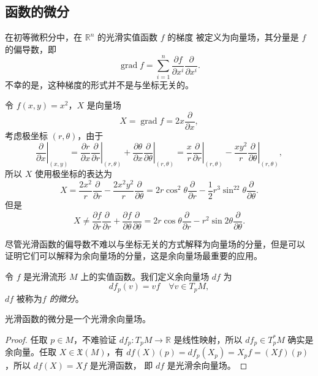 \documentclass[fontset=none]{Notes}
\DeclareMathOperator\grad{grad}
\begin{document}
\subsection{函数的微分}

在初等微积分中，在 $\mathbb{R}^n$ 的光滑实值函数 $f$ 的梯度
被定义为向量场，其分量是 $f$ 的偏导数，即
\begin{equation}
  \grad f= \sum_{i=1}^n\frac{\partial f}{\partial x^i}\frac{\partial}{\partial x^i}.
\end{equation}
不幸的是，这种梯度的形式并不是与坐标无关的。

\begin{example}
  令 $f(x,y)=x^2$，$X$ 是向量场
  \[
    X=\grad f=2x\frac{\partial}{\partial x},  
  \]
  考虑极坐标 $(r,\theta)$，由于
  \[
    \left.\frac{\partial}{\partial x}\right|_{(x,y)} 
    =\frac{\partial r}{\partial x}\left.\frac{\partial}{\partial r}\right|_{(r,\theta)} 
    +\frac{\partial \theta}{\partial x}\left.\frac{\partial}{\partial \theta}\right|_{(r,\theta)} 
    =\frac{x}{r}\left.\frac{\partial}{\partial r}\right|_{(r,\theta)} 
    -\frac{xy^2}{r}\left.\frac{\partial}{\partial \theta}\right|_{(r,\theta)},
  \]
  所以 $X$ 使用极坐标的表达为
  \[
    X=  \frac{2x^2}{r}\frac{\partial}{\partial r}
    -\frac{2x^2y^2}{r}\frac{\partial}{\partial \theta}
    =2r\cos^2\theta\frac{\partial}{\partial r}-
    \frac{1}{2}r^3\sin^22\theta\frac{\partial}{\partial \theta}.
  \]
  但是
  \[
    X\neq \frac{\partial f}{\partial r}\frac{\partial}{\partial r}
    +\frac{\partial f}{\partial\theta}\frac{\partial}{\partial \theta}
    =2r\cos\theta  \frac{\partial}{\partial r}-r^2\sin 2\theta
    \frac{\partial}{\partial \theta}.
  \]
\end{example}

尽管光滑函数的偏导数不难以与坐标无关的方式解释为向量场的分量，但是可以
证明它们可以解释为余向量场的分量，这是余向量场最重要的应用。

令 $f$ 是光滑流形 $M$ 上的实值函数。我们定义余向量场 $df$ 为
\[
  df_p(v)=vf\quad \forall v\in T_pM,  
\]
$df$ 被称为\emph{$f$ 的微分}。

\begin{proposition}
  光滑函数的微分是一个光滑余向量场。
\end{proposition}
\begin{proof}
  任取 $p\in M$，不难验证 $df_p:T_pM\to \mathbb{R}$ 是线性映射，所以
  $df_p\in T_p^*M$ 确实是余向量。任取 $X\in \mathfrak{X}(M)$，有
  $df(X)(p)=df_p(X_p)=X_pf=(Xf)(p)$，所以 $df(X)=Xf$ 是光滑函数，
  即 $df$ 是光滑余向量场。
\end{proof}
\end{document}
